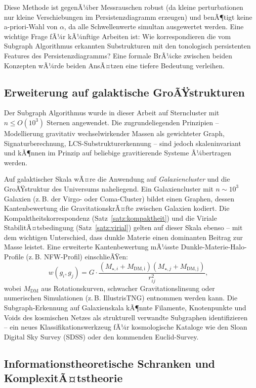 ﻿\documentclass[a4paper,12pt]{report}
\theoremstyle{definition}
\begin{document}
Diese Methode ist gegenÃ¼ber Messrauschen robust (da kleine perturbationen nur kleine Verschiebungen im Persistenzdiagramm erzeugen) und benÃ¶tigt keine a-priori-Wahl von $\alpha$, da alle Schwellenwerte simultan ausgewertet werden. Eine wichtige Frage fÃ¼r kÃ¼nftige Arbeiten ist: Wie korrespondieren die vom Subgraph Algorithmus erkannten Substrukturen mit den tonologisch persistenten Features des Persistenzdiagramms? Eine formale BrÃ¼cke zwischen beiden Konzepten wÃ¼rde beiden AnsÃ¤tzen eine tiefere Bedeutung verleihen.

\subsection{Erweiterung auf galaktische GroÃŸstrukturen}

Der Subgraph Algorithmus wurde in dieser Arbeit auf Sterncluster mit $n \leq O(10^3)$ Sternen angewendet. Die zugrundeliegenden Prinzipien -- Modellierung gravitativ wechselwirkender Massen als gewichteter Graph, Signaturberechnung, LCS-Substrukturerkennung -- sind jedoch skaleninvariant und kÃ¶nnen im Prinzip auf beliebige gravitierende Systeme Ã¼bertragen werden.

Auf galaktischer Skala wÃ¤re die Anwendung auf \emph{Galaxiencluster} und die GroÃŸstruktur des Universums naheliegend. Ein Galaxiencluster mit $n \sim 10^3$ Galaxien (z.\,B. der Virgo- oder Coma-Cluster) bildet einen Graphen, dessen Kantenbewertung die GravitationskrÃ¤fte zwischen Galaxien kodiert. Die Kompaktheitskorrespondenz (Satz~\ref{satz:kompaktheit}) und die Viriale StabilitÃ¤tsbedingung (Satz~\ref{satz:virial}) gelten auf dieser Skala ebenso -- mit dem wichtigen Unterschied, dass dunkle Materie einen dominanten Beitrag zur Masse leistet. Eine erweiterte Kantenbewertung mÃ¼sste Dunkle-Materie-Halo-Profile (z.\,B. NFW-Profil) einschlieÃŸen:
\[
w(g_i, g_j) = G \cdot \frac{(M_{\star,i} + M_\mathrm{DM,i})(M_{\star,j} + M_\mathrm{DM,j})}{r_{ij}^2},
\]
wobei $M_\mathrm{DM}$ aus Rotationskurven, schwacher Gravitationslinsung oder numerischen Simulationen (z.\,B. IllustrisTNG) entnommen werden kann. Die Subgraph-Erkennung auf Galaxienskala kÃ¶nnte Filamente, Knotenpunkte und Voids des kosmischen Netzes als strukturell verwandte Subgraphen identifizieren -- ein neues Klassifikationswerkzeug fÃ¼r kosmologische Kataloge wie den Sloan Digital Sky Survey (SDSS) oder den kommenden Euclid-Survey.

\subsection{Informationstheoretische Schranken und KomplexitÃ¤ts\-theorie}
\end{document}
